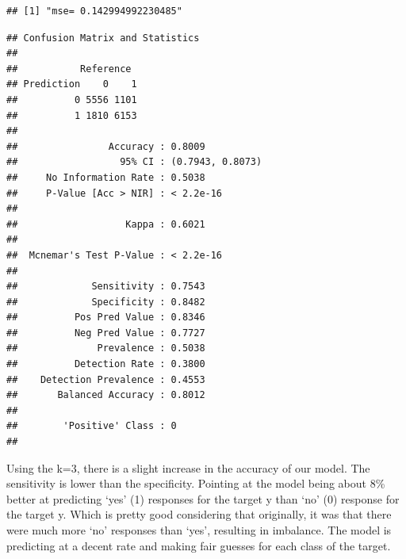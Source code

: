 \documentclass[
]{article}
\newenvironment{Shaded}{\begin{snugshade}}{\end{snugshade}}
\newcommand{\AttributeTok}[1]{\textcolor[rgb]{0.77,0.63,0.00}{#1}}
\newcommand{\DecValTok}[1]{\textcolor[rgb]{0.00,0.00,0.81}{#1}}
\newcommand{\FloatTok}[1]{\textcolor[rgb]{0.00,0.00,0.81}{#1}}
\newcommand{\FunctionTok}[1]{\textcolor[rgb]{0.00,0.00,0.00}{#1}}
\newcommand{\NormalTok}[1]{#1}
\newcommand{\OtherTok}[1]{\textcolor[rgb]{0.56,0.35,0.01}{#1}}
\newcommand{\SpecialCharTok}[1]{\textcolor[rgb]{0.00,0.00,0.00}{#1}}
\newcommand{\StringTok}[1]{\textcolor[rgb]{0.31,0.60,0.02}{#1}}
\begin{document}
\begin{verbatim}
## [1] "mse= 0.142994992230485"
\end{verbatim}

\begin{Shaded}
\end{Shaded}

\begin{verbatim}
## Confusion Matrix and Statistics
## 
##           Reference
## Prediction    0    1
##          0 5556 1101
##          1 1810 6153
##                                           
##                Accuracy : 0.8009          
##                  95% CI : (0.7943, 0.8073)
##     No Information Rate : 0.5038          
##     P-Value [Acc > NIR] : < 2.2e-16       
##                                           
##                   Kappa : 0.6021          
##                                           
##  Mcnemar's Test P-Value : < 2.2e-16       
##                                           
##             Sensitivity : 0.7543          
##             Specificity : 0.8482          
##          Pos Pred Value : 0.8346          
##          Neg Pred Value : 0.7727          
##              Prevalence : 0.5038          
##          Detection Rate : 0.3800          
##    Detection Prevalence : 0.4553          
##       Balanced Accuracy : 0.8012          
##                                           
##        'Positive' Class : 0               
## 
\end{verbatim}

Using the k=3, there is a slight increase in the accuracy of our model.
The sensitivity is lower than the specificity. Pointing at the model
being about 8\% better at predicting `yes' (1) responses for the target
y than `no' (0) response for the target y. Which is pretty good
considering that originally, it was that there were much more `no'
responses than `yes', resulting in imbalance. The model is predicting at
a decent rate and making fair guesses for each class of the target.
\end{document}
